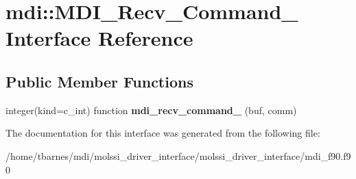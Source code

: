 \hypertarget{interfacemdi_1_1MDI__Recv__Command__}{\section{mdi\-:\-:M\-D\-I\-\_\-\-Recv\-\_\-\-Command\-\_\- Interface Reference}
\label{interfacemdi_1_1MDI__Recv__Command__}
}
\subsection*{Public Member Functions}
\begin{DoxyCompactItemize}
\item 
\hypertarget{interfacemdi_1_1MDI__Recv__Command___a22b67734eebe9ccf72cd71a8894c28e4}{integer(kind=c\-\_\-int) function {\bfseries mdi\-\_\-recv\-\_\-command\-\_\-} (buf, comm)}\label{interfacemdi_1_1MDI__Recv__Command___a22b67734eebe9ccf72cd71a8894c28e4}

\end{DoxyCompactItemize}


The documentation for this interface was generated from the following file\-:\begin{DoxyCompactItemize}
\item 
/home/tbarnes/mdi/molssi\-\_\-driver\-\_\-interface/molssi\-\_\-driver\-\_\-interface/mdi\-\_\-f90.\-f90\end{DoxyCompactItemize}
